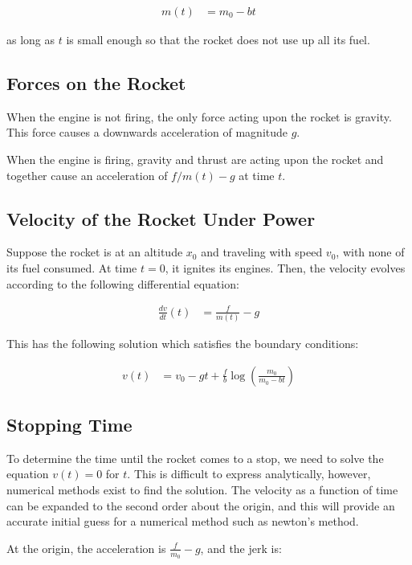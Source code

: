 \documentclass{article}
\begin{document}
\begin{align}
	m(t) & = m_0 - b t
\end{align}

as long as $t$ is small enough so that the rocket does not use up all its fuel.

\subsection{Forces on the Rocket}

When the engine is not firing, the only force acting upon the rocket is gravity.
This force causes a downwards acceleration of magnitude $g$.

When the engine is firing, gravity and thrust are acting upon the rocket
	and together cause an acceleration of $f / m(t) - g$ at time $t$.

\subsection{Velocity of the Rocket Under Power}

Suppose the rocket is at an altitude $x_0$ and traveling with speed $v_0$,
	with none of its fuel consumed.
At time $t=0$, it ignites its engines.
Then, the velocity evolves according to the following 
	differential equation:

\begin{align}
	\frac {dv}{dt} (t) & = \frac f {m(t)} - g
\end{align}

This has the following solution which satisfies the boundary conditions:

\begin{align}
	v(t) & = v_0 - g t + \frac f b \log \left( \frac {m_0} {m_0 - b t} \right)
\end{align}

\subsection{Stopping Time}

To determine the time until the rocket comes to a stop, we need to solve
	the equation $v(t) = 0$ for $t$.
This is difficult to express analytically, however, numerical methods exist
	to find the solution.
The velocity as a function of time can be expanded to the second order about
	the origin, and this will provide an accurate initial guess for a numerical
	method such as newton's method.

At the origin, the acceleration is $\frac f {m_0} - g$, and the jerk is:
\end{document}
